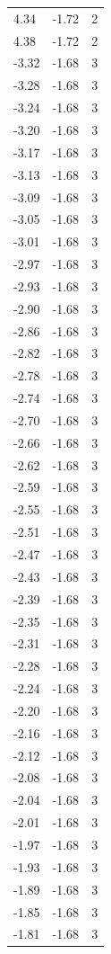 \begin{longtable}{lrr}
  4.34 & -1.72 & 2 \\
  4.38 & -1.72 & 2 \\
  -3.32 & -1.68 & 3 \\
  -3.28 & -1.68 & 3 \\
  -3.24 & -1.68 & 3 \\
  -3.20 & -1.68 & 3 \\
  -3.17 & -1.68 & 3 \\
  -3.13 & -1.68 & 3 \\
  -3.09 & -1.68 & 3 \\
  -3.05 & -1.68 & 3 \\
  -3.01 & -1.68 & 3 \\
  -2.97 & -1.68 & 3 \\
  -2.93 & -1.68 & 3 \\
  -2.90 & -1.68 & 3 \\
  -2.86 & -1.68 & 3 \\
  -2.82 & -1.68 & 3 \\
  -2.78 & -1.68 & 3 \\
  -2.74 & -1.68 & 3 \\
  -2.70 & -1.68 & 3 \\
  -2.66 & -1.68 & 3 \\
  -2.62 & -1.68 & 3 \\
  -2.59 & -1.68 & 3 \\
  -2.55 & -1.68 & 3 \\
  -2.51 & -1.68 & 3 \\
  -2.47 & -1.68 & 3 \\
  -2.43 & -1.68 & 3 \\
  -2.39 & -1.68 & 3 \\
  -2.35 & -1.68 & 3 \\
  -2.31 & -1.68 & 3 \\
  -2.28 & -1.68 & 3 \\
  -2.24 & -1.68 & 3 \\
  -2.20 & -1.68 & 3 \\
  -2.16 & -1.68 & 3 \\
  -2.12 & -1.68 & 3 \\
  -2.08 & -1.68 & 3 \\
  -2.04 & -1.68 & 3 \\
  -2.01 & -1.68 & 3 \\
  -1.97 & -1.68 & 3 \\
  -1.93 & -1.68 & 3 \\
  -1.89 & -1.68 & 3 \\
  -1.85 & -1.68 & 3 \\
  -1.81 & -1.68 & 3 \\

\end{longtable}
